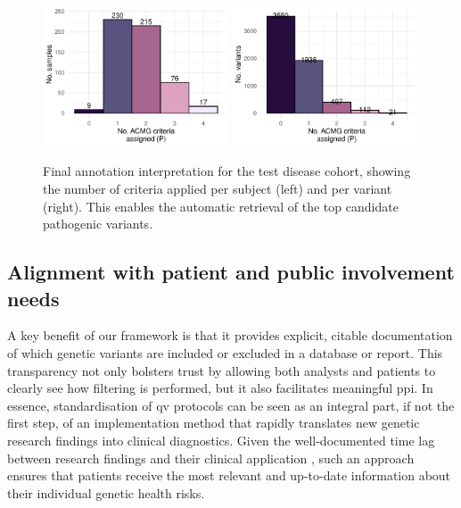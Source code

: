 \begin{figure}[!h]
\centering
\includegraphics[width=0.49\textwidth]{./images/Guru_singlecase_criteria_per_sample_small.pdf}
\includegraphics[width=0.49\textwidth]{./images/Guru_singlecase_variants_per_criteria_small.pdf}
\caption{Final annotation interpretation for the test disease cohort, showing the number of criteria applied per subject (left) and per variant (right). This enables the automatic retrieval of the top candidate pathogenic variants.}
\label{fig:guru_case_study_guruscores}
\end{figure}
\FloatBarrier

\subsection{Alignment with patient and public involvement needs}
A key benefit of our framework is that it provides explicit, citable documentation of which genetic variants are included or excluded in a database or report. This transparency not only bolsters trust by allowing both analysts and patients to clearly see how filtering is performed, but it also facilitates meaningful \ac{ppi}. In essence, standardisation of \ac{qv} protocols can be seen as an integral part, if not the first step, of an implementation method that rapidly translates new genetic research findings into clinical diagnostics. Given the well-documented time lag between research findings and their clinical application \cite{morris_answer_2011}, such an approach ensures that patients receive the most relevant and up-to-date information about their individual genetic health risks.

